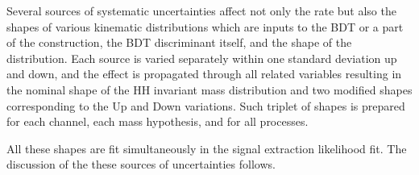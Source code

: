 Several sources of systematic uncertainties affect not only the rate but also the shapes of various
kinematic distributions which are inputs to the BDT or a part of the \mTHH construction, the BDT discriminant itself, and the shape of the \mTHH distribution. Each source is varied separately within one standard deviation up and down, and
the effect is propagated through all related variables resulting in
the nominal shape of the HH invariant mass distribution and two
modified shapes corresponding to the Up and Down variations. Such triplet of shapes is prepared for each channel, each mass hypothesis, and for all processes. %

All these shapes are fit simultaneously in the
signal extraction likelihood fit. The discussion of the these sources
of uncertainties follows.



